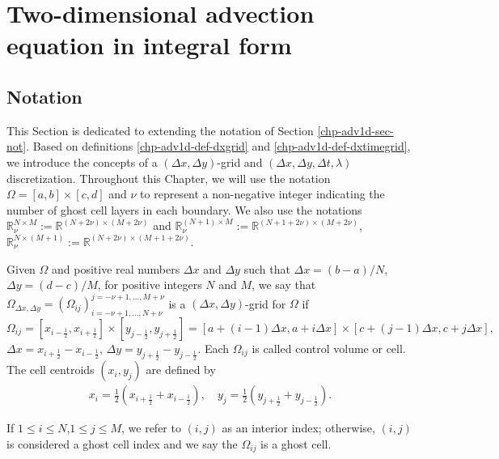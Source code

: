 \section{Two-dimensional advection equation in integral form}
\label{sec-adv2d}
\subsection{Notation}
\label{chp-adv2d-sec-not}
This Section is dedicated to extending the notation of Section \ref{chp-adv1d-sec-not}.
Based on definitions \ref{chp-adv1d-def-dxgrid} and \ref{chp-adv1d-def-dxtimegrid},
we introduce the concepts of a $(\Delta x,\Delta y)$-grid and $(\Delta x, \Delta y, \Delta t, \lambda)$ discretization.
Throughout this Chapter, we will use the notation $\Omega=[a,b]\times[c,d]$
and $\nu$ to represent a non-negative integer indicating the number of ghost cell layers in each boundary.
We also use the notations $\mathbb{R}^{N\times M}_{\nu}:=\mathbb{R}^{(N+2\nu)\times (M+2\nu)}$ and
$\mathbb{R}^{(N+1)\times M}_{\nu}:=\mathbb{R}^{(N+1+2\nu)\times (M+2\nu)}$,
$\mathbb{R}^{N\times (M+1)}_{\nu}:=\mathbb{R}^{(N+2\nu)\times (M+1+2\nu)}$.
\begin{definition}
	\label{chp-adv1d-def-2dgrid}
	Given $\Omega$ and positive real numbers $\Delta x$ and $\Delta y$ such that $\Delta x = (b-a)/N$, 
	$\Delta y = (d-c)/M$, for positive integers $N$ and $M$,
	we say that $\Omega_{\Delta x, \Delta y}=(\Omega_{ij})_{i=-\nu+1,\ldots,N+\nu}^{j=-\nu+1,\ldots,M+\nu}$
	is a $(\Delta x, \Delta y)$-grid for $\Omega$ if
    \begin{equation*}
	\Omega_{ij} = [x_{i-\frac{1}{2}}, x_{i+\frac{1}{2}}]\times [y_{j-\frac{1}{2}}, y_{j+\frac{1}{2}}] =
    [a+(i-1)\Delta x,a+i\Delta x]\times [c+(j-1)\Delta x,c+j\Delta x],
    \end{equation*}
	$\Delta x = x_{i+\frac{1}{2}}-x_{i-\frac{1}{2}}$, $\Delta y = y_{j+\frac{1}{2}}-y_{j-\frac{1}{2}}$.
	Each $\Omega_{ij}$ is called control volume or cell.
	The cell centroids $(x_i,y_j)$ are defined by
    \begin{align*}
       x_i = \frac{1}{2}(x_{i+\frac{1}{2}} + x_{i-\frac{1}{2}}), \quad y_j = \frac{1}{2}(y_{j+\frac{1}{2}} + y_{j-\frac{1}{2}}).
    \end{align*}
\end{definition}
\begin{remark}
If $1 \leq i \leq N$,$1 \leq j \leq M$, we refer to $(i,j)$ as an interior index;
otherwise, $(i,j)$ is considered a ghost cell index and we say the $\Omega_{ij}$ is a ghost cell.
\end{remark}
